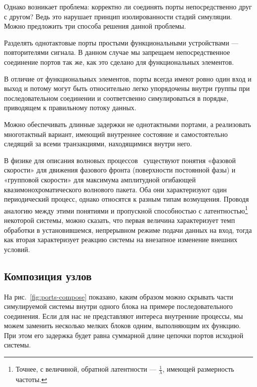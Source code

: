 Однако возникает проблема: корректно ли соединять порты непосредственно друг с другом? Ведь это нарушает принцип изолированности стадий симуляции. 
Можно предложить три способа решения данной проблемы.

\begin{enumerate*}
    \item Разделять однотактовые порты простыми функциональными устройствами — повторителями сигнала. В данном случае мы запрещаем непосредственное соединение портов так же, как это сделано для функциональных элементов.
    \item В отличие от функциональных элементов, порты всегда имеют ровно один вход и выход и потому могут быть относительно легко упорядочены внутри группы при последовательном соединении и соответсвенно симулироваться в порядке, приводящем к правильному потоку данных.
    \item Можно обеспечивать длинные задержки не однотактными портами, а реализовать многотактный вариант, имеющий внутреннее состояние и самостоятельно следящий за всеми транзакциями, находящимися внутри него.
\end{enumerate*}

\begin{digression}%

В физике для описания волновых процессов~\cite{sivukhin-vol5} существуют понятия «фазовой скорости» для движения фазового фронта (поверхности постоянной фазы) и «групповой скорости» для максимума амплитудной огибающей квазимонохроматического волнового пакета. Оба они характеризуют один периодический процесс, однако относятся к разным типам возмущения. Проводя аналогию между этими понятиями и пропускной способностью с латентностью\footnote{Точнее, с величиной, обратной латентности — $\frac{1}{\lambda}$, имеющей размерность частоты.} некоторой системы, можно сказать, что первая величина характеризует темп обработки в установившемся, непрерывном режиме подачи данных на вход, тогда как вторая характеризует реакцию системы на внезапное изменение внешних условий.
\end{digression}


\subsection{Композиция узлов}

На рис.~\ref{fig:ports-compose} показано, каким образом можно скрывать части симулируемой системы внутри одного блока на примере последовательного соединения. Если для нас не представляют интереса внутренние процессы, мы можем заменить несколько мелких блоков одним, выполняющим их функцию. При этом его задержка будет равна суммарной длине цепочки портов исходной системы.

